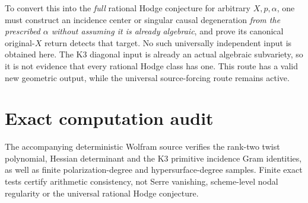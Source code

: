 \documentclass[11pt]{article}
\begin{document}
To convert this into the \emph{full} rational Hodge conjecture
for arbitrary $X,p,\alpha$, one must construct an incidence
center or singular causal degeneration \emph{from the
prescribed $\alpha$ without assuming it is already algebraic},
and prove its canonical original-$X$ return detects that
target. No such universally independent input is obtained
here. The K3 diagonal input is already an actual algebraic
subvariety, so it is not evidence that every rational
Hodge class has one. This route has a valid new geometric
output, while the universal source-forcing route remains active.

\section{Exact computation audit}
The accompanying deterministic Wolfram source verifies the
rank-two twist polynomial, Hessian determinant and the
K3 primitive incidence Gram identities, as well as finite
polarization-degree and hypersurface-degree samples.
Finite exact tests certify arithmetic consistency, not
Serre vanishing, scheme-level nodal regularity or the
universal rational Hodge conjecture.
\end{document}
